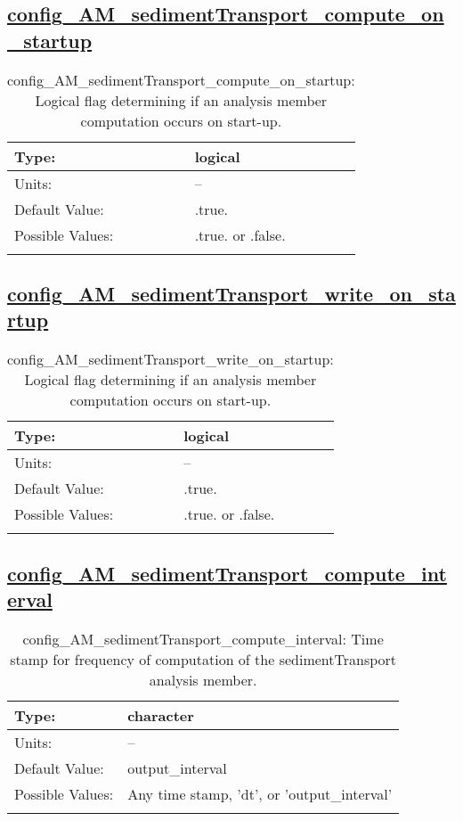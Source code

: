 \subsection[config\_AM\_sedimentTransport\_compute\_on\_startup]{\hyperref[sec:nm_tab_AM_sedimentTransport]{config\_AM\_sedimentTransport\_compute\_on\_startup}}
\label{subsec:nm_sec_config_AM_sedimentTransport_compute_on_startup}
\begin{center}
\begin{longtable}{| p{2.0in} || p{4.0in} |}
    \hline
    Type: & logical \\
    \hline
    Units: & -- \\
    \hline
    Default Value: & .true. \\
    \hline
    Possible Values: & .true. or .false. \\
    \hline
    \caption{config\_AM\_sedimentTransport\_compute\_on\_startup: Logical flag determining if an analysis member computation occurs on start-up.}
\end{longtable}
\end{center}
\subsection[config\_AM\_sedimentTransport\_write\_on\_startup]{\hyperref[sec:nm_tab_AM_sedimentTransport]{config\_AM\_sedimentTransport\_write\_on\_startup}}
\label{subsec:nm_sec_config_AM_sedimentTransport_write_on_startup}
\begin{center}
\begin{longtable}{| p{2.0in} || p{4.0in} |}
    \hline
    Type: & logical \\
    \hline
    Units: & -- \\
    \hline
    Default Value: & .true. \\
    \hline
    Possible Values: & .true. or .false. \\
    \hline
    \caption{config\_AM\_sedimentTransport\_write\_on\_startup: Logical flag determining if an analysis member computation occurs on start-up.}
\end{longtable}
\end{center}
\subsection[config\_AM\_sedimentTransport\_compute\_interval]{\hyperref[sec:nm_tab_AM_sedimentTransport]{config\_AM\_sedimentTransport\_compute\_interval}}
\label{subsec:nm_sec_config_AM_sedimentTransport_compute_interval}
\begin{center}
\begin{longtable}{| p{2.0in} || p{4.0in} |}
    \hline
    Type: & character \\
    \hline
    Units: & -- \\
    \hline
    Default Value: & output\_interval \\
    \hline
    Possible Values: & Any time stamp, 'dt', or 'output\_interval' \\
    \hline
    \caption{config\_AM\_sedimentTransport\_compute\_interval: Time stamp for frequency of computation of the sedimentTransport analysis member.}
\end{longtable}
\end{center}
